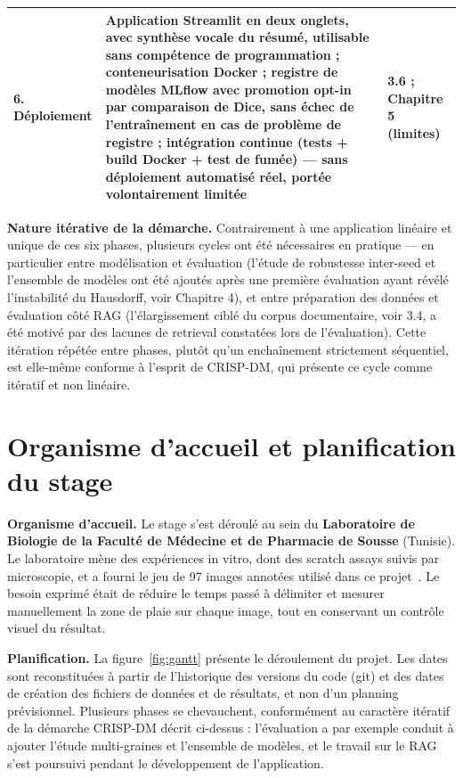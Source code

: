 \documentclass[12pt,a4paper]{report}
\begin{document}
\begin{longtable}{p{3.2cm} p{8.5cm} p{2.3cm}}
\textbf{6. Déploiement} & Application Streamlit en deux onglets, avec synthèse vocale du résumé, utilisable sans compétence de programmation ; conteneurisation Docker ; registre de modèles MLflow avec promotion opt-in par comparaison de Dice, sans échec de l'entraînement en cas de problème de registre ; intégration continue (tests + build Docker + test de fumée) --- sans déploiement automatisé réel, portée volontairement limitée & 3.6 ; Chapitre 5 (limites) \\
\bottomrule
\end{longtable}

\textbf{Nature itérative de la démarche.} Contrairement à une application linéaire et unique de ces six phases, plusieurs cycles ont été nécessaires en pratique — en particulier entre modélisation et évaluation (l'étude de robustesse inter-seed et l'ensemble de modèles ont été ajoutés après une première évaluation ayant révélé l'instabilité du Hausdorff, voir Chapitre 4), et entre préparation des données et évaluation côté RAG (l'élargissement ciblé du corpus documentaire, voir 3.4, a été motivé par des lacunes de retrieval constatées lors de l'évaluation). Cette itération répétée entre phases, plutôt qu'un enchaînement strictement séquentiel, est elle-même conforme à l'esprit de CRISP-DM, qui présente ce cycle comme itératif et non linéaire.

\section{Organisme d'accueil et planification du stage}

\textbf{Organisme d'accueil.} Le stage s'est déroulé au sein du \textbf{Laboratoire de Biologie de la Faculté de Médecine et de Pharmacie de Sousse} (Tunisie). Le laboratoire mène des expériences in vitro, dont des scratch assays suivis par microscopie, et a fourni le jeu de 97 images annotées utilisé dans ce projet~\cite{ref41}. Le besoin exprimé était de réduire le temps passé à délimiter et mesurer manuellement la zone de plaie sur chaque image, tout en conservant un contrôle visuel du résultat. %

\textbf{Planification.} La figure~\ref{fig:gantt} présente le déroulement du projet. Les dates sont reconstituées à partir de l'historique des versions du code (git) et des dates de création des fichiers de données et de résultats, et non d'un planning prévisionnel. Plusieurs phases se chevauchent, conformément au caractère itératif de la démarche CRISP-DM décrit ci-dessus : l'évaluation a par exemple conduit à ajouter l'étude multi-graines et l'ensemble de modèles, et le travail sur le RAG s'est poursuivi pendant le développement de l'application.
\end{document}
